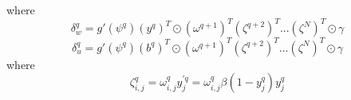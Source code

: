 \documentclass{article}
\begin{document}
%
where
%
\begin{equation} \label{eq:w_delta}
\delta_w^{q} = g'(\psi^{q}) (y^{q})^T \odot (\omega^{q+1})^T (\zeta^{q+2})^T ... (\zeta^N)^T \odot \gamma
\end{equation}
%
\begin{equation} \label{eq:u_delta}
\delta_u^{q} = g'(\psi^{q}) (b^{q})^T \odot (\omega^{q+1})^T (\zeta^{q+2})^T ... (\zeta^N)^T \odot \gamma
\end{equation}
%
where
%
\begin{equation} \label{eq:u_delta}
\zeta_{i,j}^q = \omega_{i,j}^q y_j^{\prime q} = \omega_{i,j}^q \beta (1 - y_j^q) y_j^q
\end{equation}
%
\end{document}
